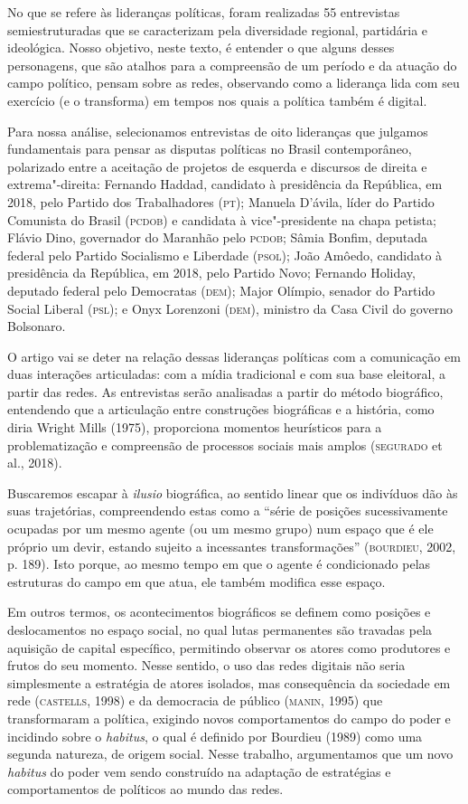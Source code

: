 No que se refere às lideranças políticas, foram realizadas 55
entrevistas semiestruturadas que se caracterizam pela diversidade
regional, partidária e ideológica. Nosso objetivo, neste texto, é
entender o que alguns desses personagens, que são atalhos para a
compreensão de um período e da atuação do campo político, pensam sobre
as redes, observando como a liderança lida com seu exercício (e o
transforma) em tempos nos quais a política também é digital.

Para nossa análise, selecionamos entrevistas de oito lideranças que
julgamos fundamentais para pensar as disputas políticas no Brasil
contemporâneo, polarizado entre a aceitação de projetos de esquerda e
discursos de direita e extrema"-direita: Fernando Haddad, candidato à
presidência da República, em 2018, pelo Partido dos Trabalhadores (\textsc{pt});
Manuela D'ávila, líder do Partido Comunista do Brasil (\textsc{pcdob}) e
candidata à vice"-presidente na chapa petista; Flávio Dino, governador do
Maranhão pelo \textsc{pcdob}; Sâmia Bonfim, deputada federal pelo Partido
Socialismo e Liberdade (\textsc{psol}); João Amôedo, candidato à presidência da
República, em 2018, pelo Partido Novo; Fernando Holiday, deputado
federal pelo Democratas (\textsc{dem}); Major Olímpio, senador do Partido Social
Liberal (\textsc{psl}); e Onyx Lorenzoni (\textsc{dem}), ministro da Casa Civil do governo
Bolsonaro.

O artigo vai se deter na relação dessas lideranças políticas com a
comunicação em duas interações articuladas: com a mídia tradicional e
com sua base eleitoral, a partir das redes. As entrevistas serão
analisadas a partir do método biográfico, entendendo que a articulação
entre construções biográficas e a história, como diria Wright Mills
(1975), proporciona momentos heurísticos para a problematização e
compreensão de processos sociais mais amplos (\textsc{segurado} et al., 2018).

Buscaremos escapar à \emph{ilusio} biográfica, ao sentido linear que os
indivíduos dão às suas trajetórias, compreendendo estas como a ``série
de posições sucessivamente ocupadas por um mesmo agente (ou um mesmo
grupo) num espaço que é ele próprio um devir, estando sujeito a
incessantes transformações'' (\textsc{bourdieu}, 2002, p. 189). Isto porque, ao
mesmo tempo em que o agente é condicionado pelas estruturas do campo em
que atua, ele também modifica esse espaço.

Em outros termos, os acontecimentos biográficos se definem como posições
e deslocamentos no espaço social, no qual lutas permanentes são travadas
pela aquisição de capital específico, permitindo observar os atores como
produtores e frutos do seu momento. Nesse sentido, o uso das redes
digitais não seria simplesmente a estratégia de atores isolados, mas
consequência da sociedade em rede (\textsc{castells}, 1998) e da democracia de
público (\textsc{manin}, 1995) que transformaram a política, exigindo novos
comportamentos do campo do poder e incidindo sobre o \emph{habitus}, o
qual é definido por Bourdieu (1989) como uma segunda natureza, de origem
social. Nesse trabalho, argumentamos que um novo \emph{habitus} do poder
vem sendo construído na adaptação de estratégias e comportamentos de
políticos ao mundo das redes.

